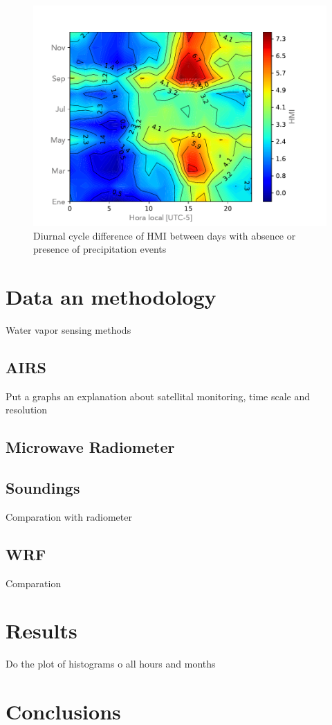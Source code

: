 \documentclass[	DIV=calc,%
							paper=a4,%
							fontsize=11pt,%
							twocolumn]{scrartcl}	 					%
\begin{document}
\begin{figure}[h!]
\centering
\includegraphics[width=1.0\linewidth]{Figuras/HMI_Matrix_resta.pdf}
\caption{Diurnal cycle difference of HMI between days with absence or presence of precipitation events }
\label{fig:HMIdifference}
\end{figure}

\section*{Data an methodology}
Water vapor sensing methods
\subsection*{AIRS}
Put a graphs an explanation about satellital monitoring, time scale and resolution
\subsection*{Microwave Radiometer}

\subsection*{Soundings}
Comparation with radiometer
\subsection*{WRF}
Comparation

\section*{Results}
Do the plot of histograms o all hours and months

\section*{Conclusions}

%
%


\end{document}

